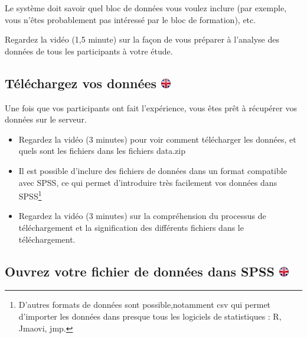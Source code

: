 \documentclass[
]{book}
\providecommand{\tightlist}{%
  \setlength{\itemsep}{0pt}\setlength{\parskip}{0pt}}
\begin{document}
Le système doit savoir quel bloc de données vous voulez inclure (par
exemple, vous n'êtes probablement pas intéressé par le bloc de
formation), etc.

Regardez la vidéo (1,5 minute) sur la façon de vous préparer à l'analyse
des données de tous les participants à votre étude.

\hypertarget{tuxe9luxe9chargez-vos-donnuxe9es}{%
\subsection[Téléchargez vos données ]{\texorpdfstring{Téléchargez vos
données
\href{https://www.psytoolkit.org/lessons/project.html\#_download_your_data}{\protect\includegraphics{img/ukflag.png}}}{Téléchargez vos données }}\label{tuxe9luxe9chargez-vos-donnuxe9es}}

Une fois que vos participants ont fait l'expérience, vous êtes prêt à
récupérer vos données sur le serveur.

\begin{itemize}
\tightlist
\item
  Regardez la vidéo (3 minutes) pour voir comment télécharger les
  données, et quels sont les fichiers dans les fichiers data.zip
\item
  Il est possible d'inclure des fichiers de données dans un format
  compatible avec SPSS, ce qui permet d'introduire très facilement vos
  données dans SPSS\footnote{D'autres formats de données sont
    possible,notamment csv qui permet d'importer les données dans
    presque tous les logiciels de statistiques : R, Jmaovi, jmp.}
\item
  Regardez la vidéo (3 minutes) sur la compréhension du processus de
  téléchargement et la signification des différents fichiers dans le
  téléchargement.
\end{itemize}

\hypertarget{ouvrez-votre-fichier-de-donnuxe9es-dans-spss}{%
\subsection[Ouvrez votre fichier de données dans SPSS
]{\texorpdfstring{Ouvrez votre fichier de données dans SPSS
\href{https://www.psytoolkit.org/lessons/project.html\#_open_your_data_file_in_spss}{\protect\includegraphics{img/ukflag.png}}}{Ouvrez votre fichier de données dans SPSS }}\label{ouvrez-votre-fichier-de-donnuxe9es-dans-spss}}
\end{document}
